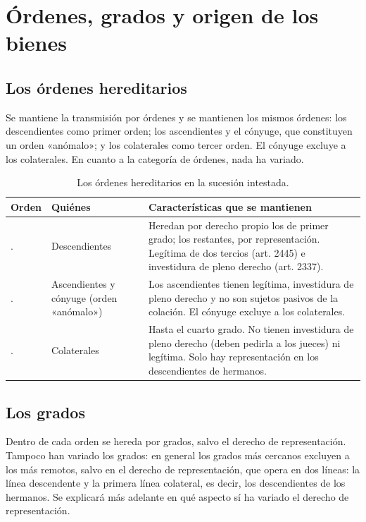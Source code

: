 \documentclass[12pt,oneside]{book}
\begin{document}
\section{Órdenes, grados y origen de los bienes}

\subsection{Los órdenes hereditarios}

Se mantiene la transmisión por órdenes y se mantienen los mismos órdenes: los descendientes como primer orden; los ascendientes y el cónyuge, que constituyen un orden «anómalo»; y los colaterales como tercer orden. El cónyuge excluye a los colaterales. En cuanto a la categoría de órdenes, nada ha variado.

\begin{table}[H]
\centering
\small
\begin{tabularx}{\textwidth}{
    >{\raggedright\arraybackslash}p{1.2cm}
    >{\raggedright\arraybackslash}p{3.6cm}
    >{\raggedright\arraybackslash}X
}
\toprule
\textbf{Orden} & \textbf{Quiénes} & \textbf{Características que se mantienen} \\
\midrule
1.\textordmasculine{} & Descendientes & Heredan por derecho propio los de primer grado; los restantes, por representación. Legítima de dos tercios (art. 2445) e investidura de pleno derecho (art. 2337). \\
\addlinespace
2.\textordmasculine{} & Ascendientes y cónyuge (orden «anómalo») & Los ascendientes tienen legítima, investidura de pleno derecho y no son sujetos pasivos de la colación. El cónyuge excluye a los colaterales. \\
\addlinespace
3.\textordmasculine{} & Colaterales & Hasta el cuarto grado. No tienen investidura de pleno derecho (deben pedirla a los jueces) ni legítima. Solo hay representación en los descendientes de hermanos. \\
\bottomrule
\end{tabularx}
\caption*{Los órdenes hereditarios en la sucesión intestada.}
\end{table}

\subsection{Los grados}

Dentro de cada orden se hereda por grados, salvo el derecho de representación. Tampoco han variado los grados: en general los grados más cercanos excluyen a los más remotos, salvo en el derecho de representación, que opera en dos líneas: la línea descendente y la primera línea colateral, es decir, los descendientes de los hermanos. Se explicará más adelante en qué aspecto sí ha variado el derecho de representación.
\end{document}
